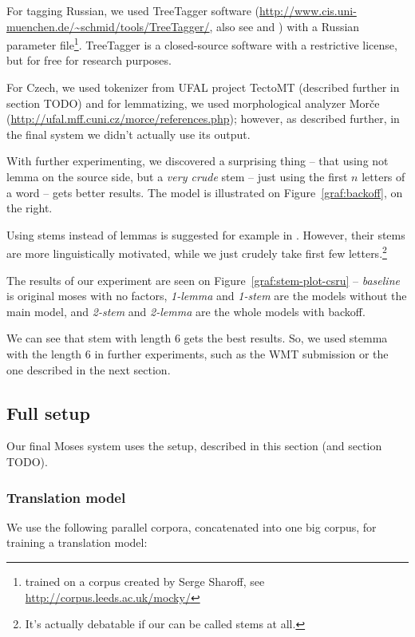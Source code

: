 For tagging Russian, we used TreeTagger software (\url{http://www.cis.uni-muenchen.de/~schmid/tools/TreeTagger/}, also see \cite{treetagger1} and \cite{treetagger2}) with a Russian parameter file\footnote{trained on a corpus created by Serge Sharoff, see \url{http://corpus.leeds.ac.uk/mocky/}}. TreeTagger is a closed-source software with a restrictive license, but for free for research purposes.

For Czech, we used tokenizer from UFAL project TectoMT (described further in section TODO) and for lemmatizing, we used morphological analyzer Morče (\url{http://ufal.mff.cuni.cz/morce/references.php}); however, as described further, in the final system we didn't actually use its output.

With further experimenting, we discovered a surprising thing -- that using not lemma on the source side, but a \emph{very crude} stem -- just using the first $n$ letters of a word -- gets better results.
The model is illustrated on Figure~\ref{graf:backoff}, on the right.

Using stems instead of lemmas is suggested for example in \cite{stemy}. However, their stems are more linguistically motivated, while we just crudely take first few letters.\footnote{It's actually debatable if our  can be called stems at all.}


The results of our experiment are seen on Figure~\ref{graf:stem-plot-csru} -- \emph{baseline} is original moses with no factors, \emph{1-lemma} and \emph{1-stem} are the  models without the main model, and \emph{2-stem} and \emph{2-lemma} are the whole models with backoff.
 
We can see that stem with length 6 gets the best results. So, we used stemma with the length 6 in further experiments, such as the WMT submission \cite{mujpaper} or the one described in the next section.

\subsection{Full setup}
Our final Moses system uses the setup, described in this section (and section TODO).

\subsubsection{Translation model}
We use the following parallel corpora, concatenated into one big  corpus, for training a translation model:

